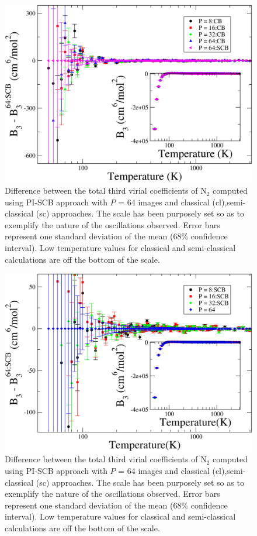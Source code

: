             \begin{figure}[!htbp]
                \centering
                \includegraphics[scale=0.20,keepaspectratio]{Chapter-5/Figures/B3N2AllPIDiff.png}
                \caption{Difference between the total third virial coefficients of N$_2$ computed using PI-SCB approach with $P$ = 64 images and classical (cl),semi-classical (sc) approaches. The scale has been purposely set so as to exemplify the nature of the oscillations observed. Error bars represent one standard deviation of the mean (68\% confidence interval). Low temperature values for classical and semi-classical calculations are off the bottom of the scale.}
                \label{fig:B3N2AllPIDiff}
            \end{figure}
            \begin{figure}[!htbp]
                \centering
                \includegraphics[scale=0.20,keepaspectratio]{Chapter-5/Figures/B3N2AllSCBDiff.png}
                \caption{Difference between the total third virial coefficients of N$_2$ computed using PI-SCB approach with $P$ = 64 images and classical (cl),semi-classical (sc) approaches. The scale has been purposely set so as to exemplify the nature of the oscillations observed. Error bars represent one standard deviation of the mean (68\% confidence interval). Low temperature values for classical and semi-classical calculations are off the bottom of the scale.}
                \label{fig:B3N2AllSCBDiff}
            \end{figure}
        \fi

